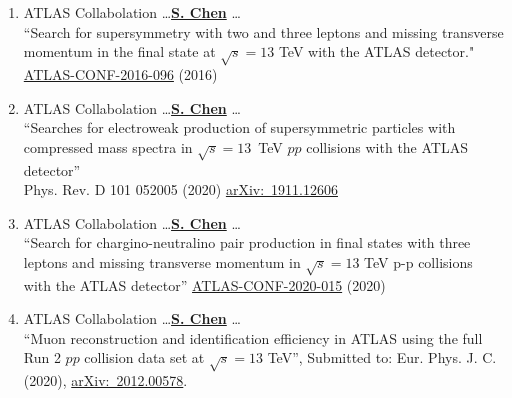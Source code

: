 \documentclass[12pt]{article}
\begin{document}
\begin{enumerate}
%
%
	\item ATLAS Collabolation \dots \underline{\textbf{S. Chen}} \dots \\
		   ``Search for supersymmetry with two and three leptons and missing transverse momentum in the final state at $\sqrt{s}=13$ TeV with the ATLAS detector."
		    \href{https://cds.cern.ch/record/2212162}{ATLAS-CONF-2016-096} (2016) \label{Pub::ATLCONF_EW_SEARCH2016}
%
	\item ATLAS Collabolation \dots \underline{\textbf{S. Chen}} \dots \\
		   ``Searches for electroweak production of supersymmetric particles with compressed mass spectra in $\sqrt{s}=13$~TeV $pp$ collisions with the ATLAS detector'' \\
	            Phys. Rev. D 101 052005 (2020)  \href{https://arxiv.org/abs/1911.12606}{arXiv:~1911.12606}  \label{Pub::ATLPaper_EWCompressed}
%
	\item ATLAS Collabolation \dots \underline{\textbf{S. Chen}} \dots \\
          ``Search for chargino-neutralino pair production in final states with three leptons and missing transverse momentum in $\sqrt{s}=13$ TeV p-p collisions with the ATLAS detector''
           \href{https://cds.cern.ch/record/2719521}{ATLAS-CONF-2020-015} (2020)  	\label{Pub::ATLCONF_EW3L_LHCP2020}          

	\item ATLAS Collabolation \dots \underline{\textbf{S. Chen}} \dots \\
              ``Muon reconstruction and identification efficiency in ATLAS using the full Run 2 $pp$ collision data set at $\sqrt{s}=13$ TeV'', Submitted to: Eur. Phys. J. C. (2020), \href{https://arxiv.org/abs/2012.00578}{arXiv:~2012.00578}. \label{Pub::ATLPaper_muon_Run2}
\end{enumerate}
\end{document}
